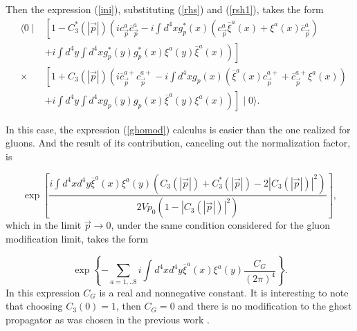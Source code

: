 \documentclass[12pt,letterpaper]{report}
\begin{document}
Then the expression (\ref{ini}), substituting (\ref{rhs}) and
(\ref{rsh1}), takes the form {\setlength\arraycolsep{0.5pt}
\begin{eqnarray}
&\langle 0\mid &\left[ 1-C_3^{*}\left(\left| \vec{p}\right|
\right) \left(ic_{\vec{p}}^a\overline{c}_{\vec{p}}^a-i\int
d^4xg_p^{*}\left(x\right) \left(c_{\vec{p}}^a\overline{\xi
}^a\left(x\right) +\xi ^a\left(x\right)
\overline{c}_{\vec{p}}^a\right) \right. \right. \nonumber \\
&&\left. \left. +i\int d^4y\int d^4xg_p^{*}\left(y\right)
g_p^{*}\left(x\right) \xi ^a\left(y\right) \bar{\xi}^a\left(
x\right) \right) \right] \nonumber \\ &\times &\left[ 1+C_3\left(
\left| \vec{p}\right| \right) \left(i\overline{c
}_{\vec{p}}^{a+}c_{\vec{p}}^{a+}-i\int d^4xg_p\left(x\right)
\left(\overline{\xi }^a\left(x\right)
c_{\vec{p}}^{a+}+\overline{c}_{\vec{p} }^{a+}\xi ^a\left(x\right)
\right) \right. \right. \nonumber \\ &&\left. \left. +i\int
d^4y\int d^4xg_p\left(y\right) g_p\left(x\right) \overline{\xi
}^a\left(y\right) \xi ^a\left(x\right) \right) \right] \mid
0\rangle. \label{ghomod}
\end{eqnarray}}

In this case, the expression (\ref{ghomod}) calculus is easier
than the one realized for gluons. And the result of its
contribution, canceling out the normalization factor, is

\begin{equation}
\exp \left[ \frac{i\int d^4xd^4y\overline{\xi }^a\left(x\right)
\xi ^a\left(y\right) \left(C_3\left(\left| \vec{p}\right| \right)
+C_3^{*}\left(\left| \vec{p}\right| \right) -2\left| C_3\left(
\left| \vec{p }\right| \right) \right| ^2\right) }{2Vp_0\left(
1-\left| C_3\left(\left| \vec{p}\right| \right) \right| ^2\right)
}\right],
\end{equation}
which in the limit $\vec{p}\rightarrow 0$, under the same
condition considered for the gluon modification limit, takes the
form

\begin{equation}
\exp \left\{ -\sum\limits_{a=1,..8}i\int d^4xd^4y\overline{\xi
}^a\left(x\right) \xi ^a\left(y\right) \frac{C_G}{\left(2\pi
\right) ^4}\right\}.
\end{equation}
In this expression $C_G$ is a real and nonnegative constant. It is
interesting to note that choosing $C_3\left(0\right) =1$, then
$C_G=0$ and there is no modification to the ghost propagator as
was chosen in the previous work \cite{Cabo}.
\end{document}
